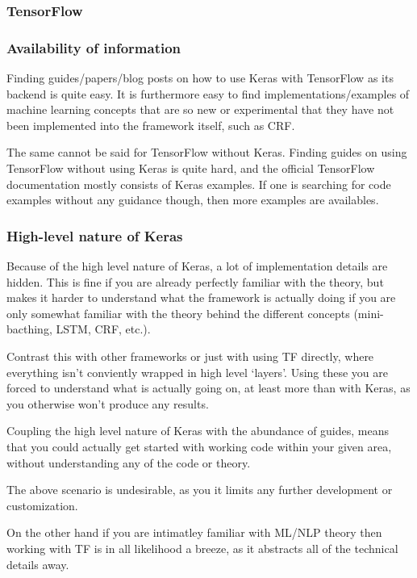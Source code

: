\subsubsection{TensorFlow}\label{sec:discuss_tensorflow}

\subsubsection*{Availability of information}

Finding guides/papers/blog posts on how to use Keras with TensorFlow as its
backend is quite easy. It is furthermore easy to find implementations/examples
of machine learning concepts that are so new or experimental that they have not
been implemented into the framework itself, such as CRF\@.

The same cannot be said for TensorFlow without Keras. Finding guides on using
TensorFlow without using Keras is quite hard, and the official TensorFlow
documentation mostly consists of Keras examples. If one is searching for code
examples without any guidance though, then more examples are availables.

\subsubsection*{High-level nature of Keras}

Because of the high level nature of Keras, a lot of implementation details are
hidden. This is fine if you are already perfectly familiar with the theory, but
makes it harder to understand what the framework is actually doing if you are
only somewhat familiar with the theory behind the different concepts
(mini-bacthing, LSTM, CRF, etc.).

Contrast this with other frameworks or just with using TF directly, where
everything isn't conviently wrapped in high level `layers'. Using these you are
forced to understand what is actually going on, at least more than with Keras,
as you otherwise won't produce any results.

Coupling the high level nature of Keras with the abundance of guides, means that
you could actually get started with working code within your given area, without
understanding any of the code or theory.

The above scenario is undesirable, as you it limits any further
development or customization.

On the other hand if you are intimatley familiar with ML/NLP theory then
working with TF is in all likelihood a breeze, as it abstracts all of the
technical details away.

